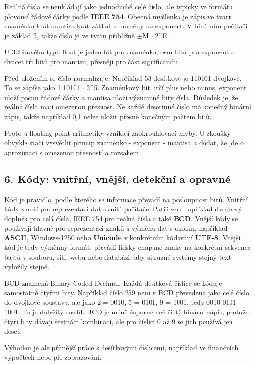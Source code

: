 \documentclass[11pt,a4paper]{article}
\begin{document}
Reálná čísla se neukládají jako jednoduché celé číslo, ale typicky ve formátu plovoucí řádové čárky podle \textbf{IEEE 754}. Obecná myšlenka je zápis ve tvaru znaménko krát mantisa krát základ umocněný na exponent. V binárním počítači je základ 2, takže číslo je ve tvaru přibližně $\pm$M $\cdot$ 2\textasciicircum{}E.

U 32bitového typu float je jeden bit pro znaménko, osm bitů pro exponent a dvacet tři bitů pro mantisu, přesněji pro část significandu.

Před uložením se číslo normalizuje. Například 53 desítkově je 110101 dvojkově. To se zapíše jako 1,10101 $\cdot$ 2\textasciicircum{}5. Znaménkový bit určí plus nebo minus, exponent uloží posun řádové čárky a mantisa uloží významné bity čísla. Důsledek je, že reálná čísla mají omezenou přesnost. Ne každé desetinné číslo má konečný binární zápis, takže například 0,1 nelze uložit přesně konečným počtem bitů.

Proto u floating point aritmetiky vznikají zaokrouhlovací chyby. U zkoušky obvykle stačí vysvětlit princip znaménko - exponent - mantisa a dodat, že jde o aproximaci s omezenou přesností a rozsahem.

\subsection*{6. Kódy: vnitřní, vnější, detekční a opravné}

Kód je pravidlo, podle kterého se informace převádí na posloupnost bitů. Vnitřní kódy slouží pro reprezentaci dat uvnitř počítače. Patří sem například dvojkový doplněk pro celá čísla, IEEE 754 pro reálná čísla a také \textbf{BCD}. Vnější kódy se používají hlavně pro reprezentaci znaků a výměnu dat s okolím, například \textbf{ASCII}, Windows-1250 nebo \textbf{Unicode} v konkrétním kódování \textbf{UTF-8}. Vnější kód je tedy výměnný formát: převádí lidsky chápané znaky na konkrétní sekvence bajtů v souboru, síti, webu nebo databázi, aby si různé systémy stejný text vyložily stejně.

BCD znamená Binary Coded Decimal. Každá desítková číslice se kóduje samostatně čtyřmi bity. Například číslo 259 není v BCD převedeno jako celé číslo do dvojkové soustavy, ale jako 2 = 0010, 5 = 0101, 9 = 1001, tedy 0010 0101 1001. To je důležitý rozdíl. BCD je méně úsporné než čistý binární zápis, protože čtyři bity dávají šestnáct kombinací, ale pro číslici 0 až 9 se jich používá jen deset.

Výhodou je ale přímější práce s desítkovými číslicemi, například ve finančních výpočtech nebo při zobrazování.
\end{document}
